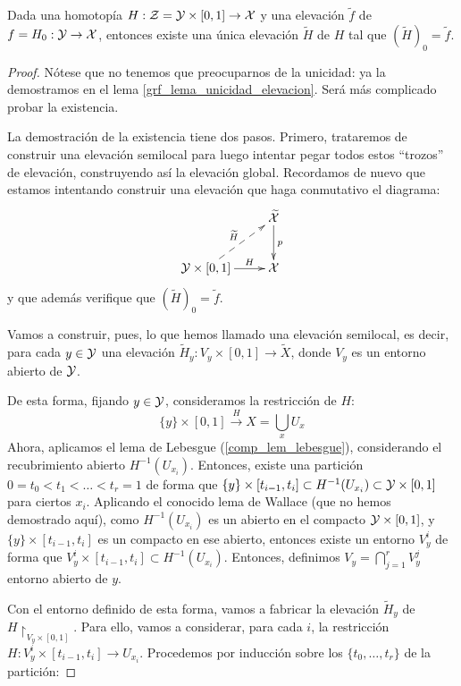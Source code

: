 \begin{lem}
	\label{grf_lema_elevacion_homotopias}
	Dada una homotopía $H:\mathcal{Z}=\mathcal{Y}\times [0,1]\to\mathcal{X}$ y una elevación $\widetilde{f}$ de $f=H_0:\mathcal{Y}\to\mathcal{X}$, entonces existe una única elevación $\widetilde{H}$ de $H$ tal que $(\widetilde{H})_0=\widetilde{f}$.
	
	\begin{proof}
		Nótese que no tenemos que preocuparnos de la unicidad: ya la demostramos en el lema \ref{grf_lema_unicidad_elevacion}. Será más complicado probar la existencia.
		
		La demostración de la existencia tiene dos pasos. Primero, trataremos de construir una elevación semilocal para luego intentar pegar todos estos ``trozos'' de elevación, construyendo así la elevación global. Recordamos de nuevo que estamos intentando construir una elevación que haga conmutativo el diagrama:
		\[\xymatrix{
			& \widetilde{\X} \ar[d]^p \\
			\Y\times [0,1] \ar@{-->}[ru]^{\widetilde{H}} \ar[r]^-H & \X
		}\]
		y que además verifique que $(\widetilde{H})_0=\widetilde{f}$.
		
		Vamos a construir, pues, lo que hemos llamado una elevación semilocal, es decir, para cada $y\in\mathcal{Y}$ una elevación $\widetilde{H}_y:V_y\times [0,1]\to\widetilde{X}$, donde $V_y$ es un entorno abierto de $\mathcal{Y}$.
		
		De esta forma, fijando $y\in \mathcal{Y}$, consideramos la restricción de $H$:
		\[\{y\}\times [0,1]\overset{H}{\to}X=\bigcup_x U_x\]
		Ahora, aplicamos el lema de Lebesgue (\ref{comp_lem_lebesgue}), considerando el recubrimiento abierto $H^{-1}(U_{x_i})$. Entonces, existe una partición $0=t_0<t_1<\dots<t_r=1$ de forma que $\{y\}\times [t_{i-1}, t_i]\subset H^{-1}(U_{x_i})\subset \mathcal{Y}\times [0,1]$ para ciertos $x_i$. Aplicando el conocido lema de Wallace (que no hemos demostrado aquí), como $H^{-1}(U_{x_i})$ es un abierto en el compacto $\mathcal{Y}\times [0,1]$, y $\{y\}\times [t_{i-1},t_i]$ es un compacto en ese abierto, entonces existe un entorno $V_y^i$ de forma que $V_y^i\times [t_{i-1},t_i]\subset H^{-1}(U_{x_i})$. Entonces, definimos $V_y=\bigcap_{j=1}^r V_y^j$ entorno abierto de $y$.
		
		Con el entorno definido de esta forma, vamos a fabricar la elevación $\widetilde{H}_y$ de $H\restriction_{V_y\times [0,1]}$. Para ello, vamos a considerar, para cada $i$, la restricción $H:V_y^i\times [t_{i-1},t_i]\to U_{x_i}$. Procedemos por inducción sobre los $\{t_0,\dots, t_r\}$ de la partición:
		

\end{proof}
\end{lem}
